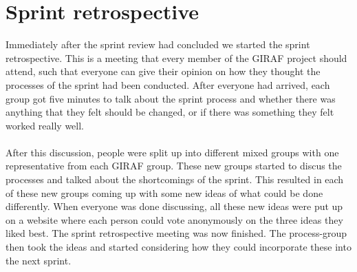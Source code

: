 \section{Sprint retrospective}
Immediately after the sprint review had concluded we started the sprint retrospective. 
This is a meeting that every member of the GIRAF project should attend, such that everyone can give their opinion on how they thought the processes of the sprint had been conducted.
After everyone had arrived, each group got five minutes to talk about the sprint process and whether there was anything that they felt should be changed, or if there was something they felt worked really well.
\\\\
After this discussion, people were split up into different mixed groups with one representative from each GIRAF group. 
These new groups started to discus the processes and talked about the shortcomings of the sprint. 
This resulted in each of these new groups coming up with some new ideas of what could be done differently.
When everyone was done discussing, all these new ideas were put up on a website where each person could vote anonymously on the three ideas they liked best.
The sprint retrospective meeting was now finished. 
The process-group then took the ideas and started considering how they could incorporate these into the next sprint.

